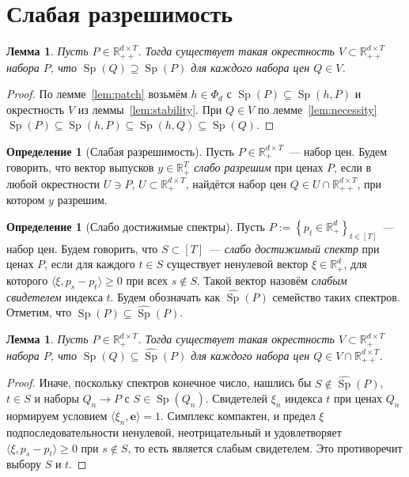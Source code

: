 \documentclass[a4paper,11pt]{article}
\theoremstyle{plain}
\newtheorem{lemma}[theorem]{Лемма}
\theoremstyle{definition}
\newtheorem{definition}[theorem]{Определение}
\theoremstyle{remark}
\newcommand{\R}{\mathbb{R}}
\newcommand{\set}[1]{\left\{ #1 \right\}}
\newcommand{\ip}[2]{\langle #1, #2\rangle} %
\newcommand{\Rpp}[1][2]{\R^{#1}_{++}} %
\newcommand{\Rp}[1][2]{\R^{#1}_{+}}   %
\DeclareMathOperator{\Sp}{Sp}
\begin{document}
\section{Слабая разрешимость}

\begin{lemma}\label{lem:open}
    Пусть $P\in\Rpp[d\times T]$. Тогда существует такая окрестность $V\subset\Rpp[d\times T]$ набора $P$, что $\Sp(Q)\supseteq\Sp(P)$ для каждого набора цен $Q\in V$.
\end{lemma}

\begin{proof}
    По лемме~\ref{lem:patch} возьмём $h\in\Phi_d$ с $\Sp(P)\subseteq\Sp(h,P)$ и окрестность $V$ из леммы~\ref{lem:stability}. При $Q\in V$ по лемме~\ref{lem:necessity} $\Sp(P)\subseteq\Sp(h,P)\subseteq\Sp(h,Q)\subseteq\Sp(Q)$.
\end{proof}

\begin{definition}[Слабая разрешимость]\label{def:weak-solvability}
    Пусть $P\in\Rp[d\times T]$~--- набор цен. Будем говорить, что вектор выпусков $y\in\Rp[T]$ \textit{слабо разрешим} при ценах $P$, если в любой окрестности $U\ni P$, $U\subset\Rp[d\times T]$, найдётся набор цен $Q\in U\cap\Rpp[d\times T]$, при котором $y$ разрешим.
\end{definition}

\begin{definition}[Слабо достижимые спектры]\label{def:weak}
    Пусть $P:=\set{p_{t}\in\Rp[d]}_{t\in[T]}$~--- набор цен. Будем говорить, что $S\subset[T]$~--- \textit{слабо достижимый спектр} при ценах $P$, если для каждого $t\in S$ существует ненулевой вектор $\xi\in\Rp[d]$, для которого $\ip{\xi}{p_s-p_t}\ge0$ при всех $s\notin S$. Такой вектор назовём \textit{слабым свидетелем} индекса $t$. Будем обозначать как $\widehat{\Sp}(P)$ семейство таких спектров.
    Отметим, что $\Sp(P)\subseteq\widehat{\Sp}(P)$.
\end{definition}

\begin{lemma}\label{lem:limit}
    Пусть $P\in\Rp[d\times T]$. Тогда существует такая окрестность $V\subset\Rp[d\times T]$ набора $P$, что $\Sp(Q)\subseteq\widehat{\Sp}(P)$ для каждого набора цен $Q\in V\cap\Rpp[d\times T]$.
\end{lemma}

\begin{proof}
    Иначе, поскольку спектров конечное число, нашлись бы $S\notin\widehat{\Sp}(P)$, $t\in S$ и наборы $Q_n\to P$ с $S\in\Sp(Q_n)$. Свидетелей $\xi_n$ индекса $t$ при ценах $Q_n$ нормируем условием $\ip{\xi_n}{\mathbf e}=1$. Симплекс компактен, и предел $\xi$ подпоследовательности ненулевой, неотрицательный и удовлетворяет $\ip{\xi}{p_s-p_t}\ge0$ при $s\notin S$, то есть является слабым свидетелем. Это противоречит выбору $S$ и $t$.
\end{proof}
\end{document}
